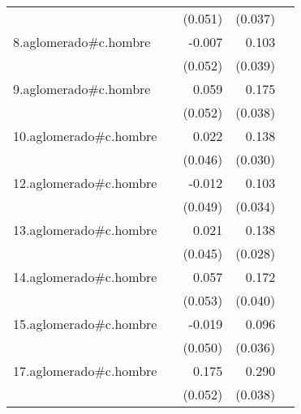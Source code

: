 {\begin{longtable}{l*{4}{D{.}{.}{-1}}}
            &                     &     (0.051)         &     (0.037)         &                     \\
\addlinespace
8.aglomerado#c.hombre&                     &      -0.007         &       0.103\sym{**} &                     \\
            &                     &     (0.052)         &     (0.039)         &                     \\
\addlinespace
9.aglomerado#c.hombre&                     &       0.059         &       0.175\sym{***}&                     \\
            &                     &     (0.052)         &     (0.038)         &                     \\
\addlinespace
10.aglomerado#c.hombre&                     &       0.022         &       0.138\sym{***}&                     \\
            &                     &     (0.046)         &     (0.030)         &                     \\
\addlinespace
12.aglomerado#c.hombre&                     &      -0.012         &       0.103\sym{**} &                     \\
            &                     &     (0.049)         &     (0.034)         &                     \\
\addlinespace
13.aglomerado#c.hombre&                     &       0.021         &       0.138\sym{***}&                     \\
            &                     &     (0.045)         &     (0.028)         &                     \\
\addlinespace
14.aglomerado#c.hombre&                     &       0.057         &       0.172\sym{***}&                     \\
            &                     &     (0.053)         &     (0.040)         &                     \\
\addlinespace
15.aglomerado#c.hombre&                     &      -0.019         &       0.096\sym{**} &                     \\
            &                     &     (0.050)         &     (0.036)         &                     \\
\addlinespace
17.aglomerado#c.hombre&                     &       0.175\sym{***}&       0.290\sym{***}&                     \\
            &                     &     (0.052)         &     (0.038)         &                     \\

\end{longtable}}
